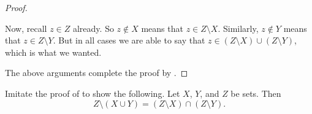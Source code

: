 \documentclass[../notes.tex]{subfiles}
\begin{document}
\begin{proof}
\begin{itemize}
        Now, recall $z\in Z$ already. So $z\notin X$ means that $z\in Z\setminus X$. Similarly, $z\notin Y$ means that $z\in Z\setminus Y$. But in all cases we are able to say that $z\in(Z\setminus X)\cup(Z\setminus Y)$, which is what we wanted.
    \end{itemize}
    The above arguments complete the proof by .
\end{proof}
\begin{exercise}
    Imitate the proof of  to show the following. Let $X$, $Y$, and $Z$ be sets. Then
    \[Z\setminus(X\cup Y)=(Z\setminus X)\cap(Z\setminus Y).\]
\end{exercise}
\end{document}
